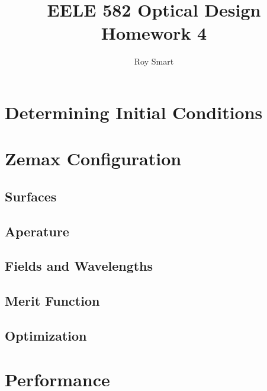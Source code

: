 \documentclass[10pt,a4paper]{article}
\title{EELE 582 Optical Design \\ Homework 4}
\author{Roy Smart}
\begin{document}
	
\maketitle	

\section{Determining Initial Conditions}
\section{Zemax Configuration}
	\subsection{Surfaces}
	\subsection{Aperature}
	\subsection{Fields and Wavelengths}
	\subsection{Merit Function}
	\subsection{Optimization}
\section{Performance}
	
\end{document}
